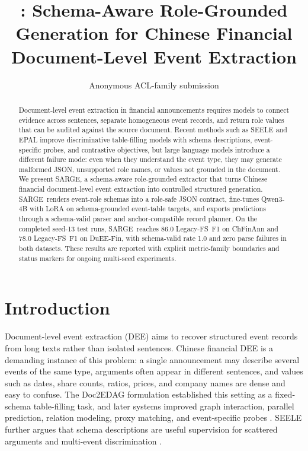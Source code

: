 \documentclass[11pt]{article}
\title{\method: Schema-Aware Role-Grounded Generation for Chinese Financial Document-Level Event Extraction}
\author{Anonymous ACL-family submission}
\newcommand{\method}{SARGE}
\newcommand{\legacy}{Legacy-FS}
\begin{document}
\maketitle

\begin{abstract}
Document-level event extraction in financial announcements requires models to connect evidence across sentences, separate homogeneous event records, and return role values that can be audited against the source document. Recent methods such as SEELE and EPAL improve discriminative table-filling models with schema descriptions, event-specific probes, and contrastive objectives, but large language models introduce a different failure mode: even when they understand the event type, they may generate malformed JSON, unsupported role names, or values not grounded in the document. We present \method, a schema-aware role-grounded extractor that turns Chinese financial document-level event extraction into controlled structured generation. \method\ renders event-role schemas into a role-safe JSON contract, fine-tunes Qwen3-4B with LoRA on schema-grounded event-table targets, and exports predictions through a schema-valid parser and anchor-compatible record planner. On the completed seed-13 test runs, \method\ reaches 86.0 \legacy\ F1 on ChFinAnn and 78.0 \legacy\ F1 on DuEE-Fin, with schema-valid rate 1.0 and zero parse failures in both datasets. These results are reported with explicit metric-family boundaries and status markers for ongoing multi-seed experiments.
\end{abstract}

\section{Introduction}

Document-level event extraction (DEE) aims to recover structured event records from long texts rather than isolated sentences. Chinese financial DEE is a demanding instance of this problem: a single announcement may describe several events of the same type, arguments often appear in different sentences, and values such as dates, share counts, ratios, prices, and company names are dense and easy to confuse. The Doc2EDAG formulation \citep{zheng2019doc2edag} established this setting as a fixed-schema table-filling task, and later systems improved graph interaction, parallel prediction, relation modeling, proxy matching, and event-specific probes \citep{xu2021git,yang2021ppn,liang2022raat,wang2023procnet,hu2025epal}. SEELE further argues that schema descriptions are useful supervision for scattered arguments and multi-event discrimination \citep{xu2024seele}.
\end{document}
